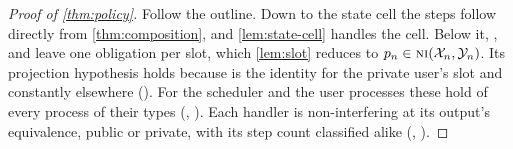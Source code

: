 \begin{proof}[Proof of \cref{thm:policy}]
Follow the outline. Down to the state cell the
steps follow directly from \cref{thm:composition}, and \cref{lem:state-cell} handles
the cell. Below it, ,
 and  leave one obligation per slot, which \cref{lem:slot} reduces
to $p_n \in \text{\normalfont\scshape ni}(\mathcal{X}_n,\mathcal{Y}_n)$. Its projection hypothesis holds because  is
the identity for the private user's slot and constantly  elsewhere
(). For the scheduler and the user processes these hold of
every process of their types (, ). Each handler is non-interfering at its output's
equivalence, public or private, with its step count classified alike
(, ).
\end{proof}
